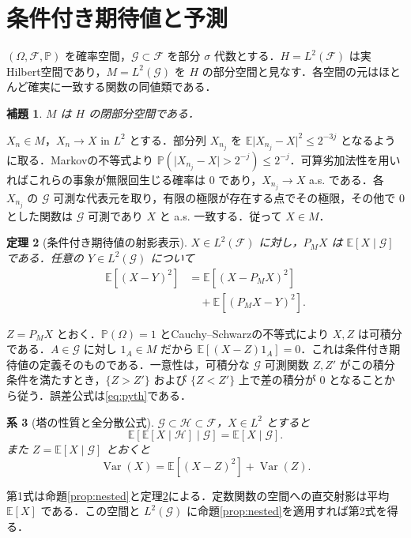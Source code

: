 \documentclass[a5paper,10pt,onecolumn]{jsarticle}
\makeatletter
\theoremstyle{mathnotetheorem}
\newtheorem{theorem}{定理}[section]
\newtheorem{lemma}[theorem]{補題}
\newtheorem{corollary}[theorem]{系}
\renewcommand{\proofname}{証明}
\renewenvironment{proof}[1][\proofname]{%
  \par\pushQED{\qed}\normalfont\topsep4\p@\@plus2\p@\relax
  \trivlist\item[\hskip\labelsep\bfseries #1]\ignorespaces
}{\popQED\endtrivlist\@endpefalse}
\newcommand{\abs}[1]{\lvert #1\rvert}
\makeatother
\begin{document}
\section{条件付き期待値と予測}
$(\Omega,\mathcal F,\mathbb P)$ を確率空間，$\mathcal G\subset\mathcal F$ を部分 $\sigma$ 代数とする．$H=L^2(\mathcal F)$ は実Hilbert空間であり，$M=L^2(\mathcal G)$ を $H$ の部分空間と見なす．各空間の元はほとんど確実に一致する関数の同値類である．
\begin{lemma}
$M$ は $H$ の閉部分空間である．
\end{lemma}
\begin{proof}
$X_n\in M$，$X_n\to X$ in $L^2$ とする．部分列 $X_{n_j}$ を $\mathbb E\abs{X_{n_j}-X}^2\le2^{-3j}$ となるように取る．Markovの不等式より
$\mathbb P(\abs{X_{n_j}-X}>2^{-j})\le2^{-j}$．可算劣加法性を用いればこれらの事象が無限回生じる確率は $0$ であり，$X_{n_j}\to X$ a.s. である．各 $X_{n_j}$ の $\mathcal G$ 可測な代表元を取り，有限の極限が存在する点でその極限，その他で $0$ とした関数は $\mathcal G$ 可測であり $X$ と a.s. 一致する．従って $X\in M$．
\end{proof}
\begin{theorem}[条件付き期待値の射影表示]\label{thm:cond}
$X\in L^2(\mathcal F)$ に対し，$P_MX$ は $\mathbb E[X\mid\mathcal G]$ である．任意の $Y\in L^2(\mathcal G)$ について
\begin{align*}
 \mathbb E[(X-Y)^2]&=\mathbb E[(X-P_MX)^2]\\
 &\quad+\mathbb E[(P_MX-Y)^2].
\end{align*}
\end{theorem}
\begin{proof}
$Z=P_MX$ とおく．$\mathbb P(\Omega)=1$ とCauchy--Schwarzの不等式により $X,Z$ は可積分である．$A\in\mathcal G$ に対し $1_A\in M$ だから $\mathbb E[(X-Z)1_A]=0$．これは条件付き期待値の定義そのものである．一意性は，可積分な $\mathcal G$ 可測関数 $Z,Z'$ がこの積分条件を満たすとき，$\{Z>Z'\}$ および $\{Z<Z'\}$ 上で差の積分が $0$ となることから従う．誤差公式は\eqref{eq:pyth}である．
\end{proof}
\begin{corollary}[塔の性質と全分散公式]
$\mathcal G\subset\mathcal H\subset\mathcal F$，$X\in L^2$ とすると
\[
 \mathbb E[\mathbb E[X\mid\mathcal H]\mid\mathcal G]
 =\mathbb E[X\mid\mathcal G].
\]
また $Z=\mathbb E[X\mid\mathcal G]$ とおくと
\[
 \operatorname{Var}(X)=\mathbb E[(X-Z)^2]+\operatorname{Var}(Z).
\]
\end{corollary}
\begin{proof}
第1式は命題\ref{prop:nested}と定理\ref{thm:cond}による．定数関数の空間への直交射影は平均 $\mathbb E[X]$ である．この空間と $L^2(\mathcal G)$ に命題\ref{prop:nested}を適用すれば第2式を得る．
\end{proof}
\end{document}
